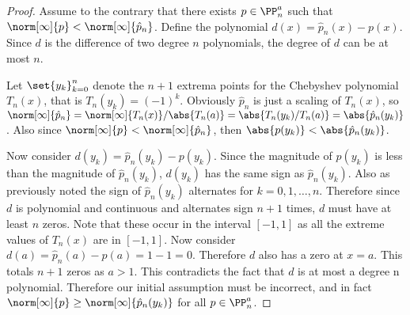 \documentclass[11pt]{article}
\begin{document}
\begin{enumerate}
\begin{enumerate}
                \begin{proof}
                    Assume to the contrary that there exists $p \in \PP_n^a$
                    such that $\norm[\infty]{p} < \norm[\infty]{\hat{p}_n}$.
                    Define the polynomial $d(x) = \hat{p}_n(x) - p(x)$.
                    Since $d$ is the difference of two degree $n$ polynomials,
                    the degree of $d$ can be at most $n$.

                    Let $\set{y_k}_{k=0}^{n}$ denote the $n + 1$ extrema points
                    for the Chebyshev polynomial $T_n(x)$, that is
                    $T_n(y_k) = (-1)^k$.
                    Obviously $\hat{p}_n$ is just a scaling of $T_n(x)$, so
                    $\norm[\infty]{\hat{p}_n} = \norm[\infty]{T_n(x)}/\abs{T_n(a)}
                    = \abs{T_n(y_k)/T_n(a)} = \abs{\hat{p}_n(y_k)}$.
                    Also since $\norm[\infty]{p} < \norm[\infty]{\hat{p}_n}$, 
                    then $\abs{p(y_k)} < \abs{\hat{p}_n(y_k)}$.

                    Now consider $d(y_k) = \hat{p}_n(y_k) - p(y_k)$.
                    Since the magnitude of $p(y_k)$ is less than the magnitude
                    of $\hat{p}_n(y_k)$, $d(y_k)$ has the same sign as
                    $\hat{p}_n(y_k)$.
                    Also as previously noted the sign of $\hat{p}_n(y_k)$
                    alternates for $k = 0, 1, \ldots, n$.
                    Therefore since $d$ is polynomial and continuous and
                    alternates sign $n + 1$ times, $d$ must have at least $n$
                    zeros.
                    Note that these occur in the interval $[-1, 1]$ as all
                    the extreme values of $T_n(x)$ are in $[-1, 1]$.
                    Now consider $d(a) =\hat{p}_n(a)  - p(a) = 1 - 1 = 0$.
                    Therefore $d$ also has a zero at $x = a$.
                    This totals $n + 1$ zeros as $a > 1$.
                    This contradicts the fact that $d$ is at most
                    a degree n polynomial.
                    Therefore our initial assumption must be incorrect, and in
                    fact $\norm[\infty]{p} \ge \norm[\infty]{\hat{p}_n(y_k)}$ for
                    all $p \in \PP_n^a$.
                \end{proof}


\end{enumerate}
\end{enumerate}
\end{document}
